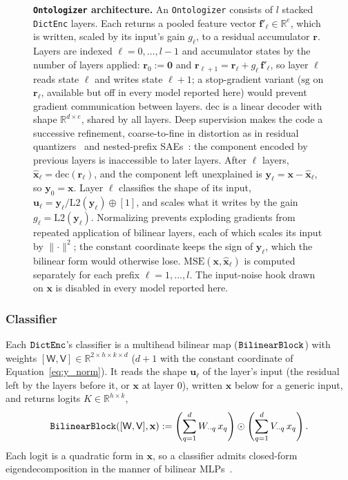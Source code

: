 \begin{figure}[tp]
\centering
\resizebox{\linewidth}{!}{}
\caption[\texttt{Ontologizer} architecture]{\textbf{\texttt{Ontologizer} architecture.}
	An \texttt{Ontologizer} consists of $l$ stacked \texttt{DictEnc} layers.
	Each returns a pooled feature vector $\mathbf{f}'_\ell\in\mathbb{R}^{e}$,
	which is written, scaled by its input's gain $g_\ell$, to a residual
	accumulator $\mathbf{r}$.
	Layers are indexed $\ell = 0, \dots, l-1$ and accumulator states by the
	number of layers applied: $\mathbf{r}_0 := \mathbf{0}$ and
	$\mathbf{r}_{\ell+1} = \mathbf{r}_\ell + g_\ell\,\mathbf{f}'_\ell$, so
	layer $\ell$ reads state $\ell$ and writes state $\ell+1$; a stop-gradient
	variant ($\mathrm{sg}$ on $\mathbf{r}_\ell$, available but off in every model
	reported here) would prevent gradient communication between layers.
	$\mathrm{dec}$ is a linear decoder with shape $\mathbb{R}^{d \times e}$,
	shared by all layers.
	Deep supervision makes the code a successive refinement, coarse-to-fine
	in distortion as in residual quantizers~\cite{zeghidour2021} and
	nested-prefix SAEs~\cite{bussmann2025}: the component encoded by
	previous layers is inaccessible to later layers.
	After $\ell$ layers, $\hat{\mathbf{x}}_\ell = \mathrm{dec}(\mathbf{r}_\ell)$, and
	the component left unexplained is
	$\mathbf{y}_\ell = \mathbf{x} - \hat{\mathbf{x}}_\ell$, so $\mathbf{y}_0 = \mathbf{x}$.
	Layer $\ell$ classifies the shape of its input,
	$\mathbf{u}_\ell
	  = \mathbf{y}_\ell / \mathrm{L2}(\mathbf{y}_\ell) \oplus [1]$, and scales
	what it writes by the gain $g_\ell = \mathrm{L2}(\mathbf{y}_\ell)$.
	Normalizing prevents exploding gradients from repeated
	application of bilinear layers, each of which scales its input by
	$\lVert\cdot\rVert^{2}$; the constant coordinate keeps the sign of
	$\mathbf{y}_\ell$, which the bilinear form would otherwise lose.
	$\mathrm{MSE}(\mathbf{x},\hat{\mathbf{x}}_\ell)$ is computed separately for
	each prefix $\ell = 1, \dots, l$. The input-noise hook drawn on $\mathbf{x}$ is disabled in
	every model reported here.
}
\label{fig:onto-stack}
\end{figure}

\subsubsection{Classifier}
\label{sec:bilinear}
Each $\mathop{\mathtt{DictEnc}}\limits$'s classifier is a multihead bilinear map
($\mathop{\mathtt{BilinearBlock}}\limits$) with weights
$[\mathsf{W}, \mathsf{V}] \in \mathbb{R}^{2 \times h \times k \times d}$
($d+1$ with the constant coordinate of Equation~\ref{eq:y_norm}). It
reads the shape $\mathbf{u}_\ell$ of the layer's input (the residual left
by the layers before it, or $\mathbf{x}$ at layer 0), written $\mathbf{x}$
below for a generic input, and returns logits $K \in \mathbb{R}^{h \times k}$,
\begin{equation}
	\mathop{\mathtt{BilinearBlock}}\limits([\mathsf{W},\mathsf{V}],\mathbf{x}) :=
	\left(\sum^{d}_{q=1}W_{\cdot\cdot q}\,x_q\right)
	 \odot \left(\sum^{d}_{q=1}V_{\cdot\cdot q}\,x_q\right).
	 \label{eq:bilinearblock}
\end{equation}
Each logit is a quadratic form in $\mathbf{x}$, so a classifier admits
closed-form eigendecomposition in the manner of bilinear
MLPs~\cite{pearce2025}.

